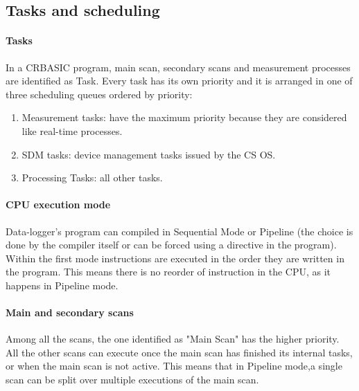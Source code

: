 \subsection{Tasks and scheduling}
\label{subsec:tasks}
\paragraph{Tasks} In a CRBASIC program, main scan, secondary scans and measurement processes
are identified as Task.
Every task has its own priority and it is arranged in one of three scheduling queues ordered by priority:
\begin{enumerate}
	\item Measurement tasks: have the maximum priority because they are considered like real-time processes.
	\item SDM tasks: device management tasks issued by the CS OS.
	\item Processing Tasks: all other tasks.
\end{enumerate}
\paragraph{CPU execution mode}
Data-logger's program can compiled in Sequential Mode or Pipeline 
(the choice is done by the compiler itself or can be forced using a directive in the program).
Within the first mode instructions are executed in the order they are written in the program.
This means there is no reorder of instruction in the CPU, as it happens in Pipeline mode.
\paragraph{Main and secondary scans}
Among all the scans, the one identified as "Main Scan" has the higher priority.
All the other scans can execute once the main scan has finished its internal tasks,
or when the main scan is not active. This means that in Pipeline mode,a single scan
can be split over multiple executions of the main scan.
